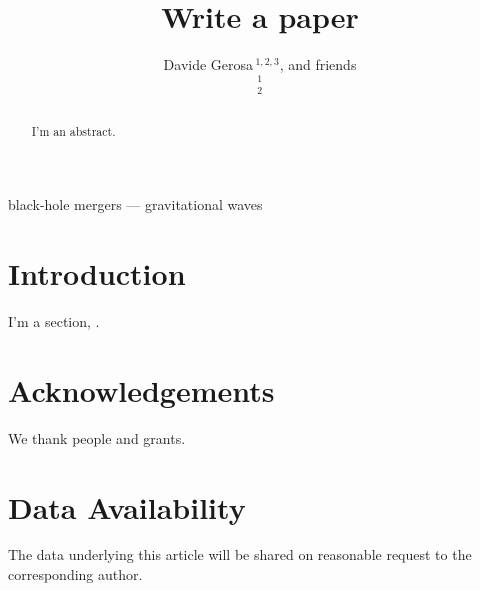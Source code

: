 \documentclass[fleqn,usenatbib]{mnras_tex_edited}
\title[Write a paper]{Write a paper}
\author[Gerosa et al.]{Davide Gerosa$\,$\orcidlink{0000-0002-0933-3579}$^{1,2,3}$, and friends
\medskip
\\
$^{1}$\milan\\
$^{2}$\infn\\
}
\begin{document}
\label{firstpage}
\pagerange{\pageref{firstpage}--\pageref{lastpage}}
\maketitle

\begin{abstract}

I'm an abstract.

\end{abstract}

\begin{keywords}
black-hole mergers --- gravitational waves
\end{keywords}


\section{Introduction}

I'm a section, \cite{2016PhRvL.116f1102A}.

\section*{Acknowledgements}

We thank people and grants.


\section*{Data Availability}
The data underlying this article will be shared on reasonable request to the corresponding author.



 
\end{document}
